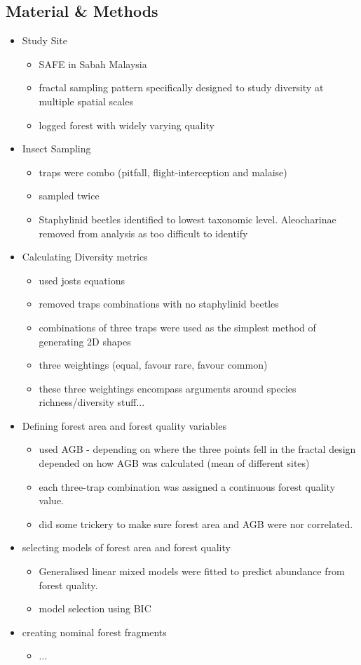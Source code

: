 \subsection*{Material \& Methods}
\begin{itemize}
	\item Study Site
	\begin{itemize}
		\item SAFE in Sabah Malaysia
		\item fractal sampling pattern specifically designed to study diversity at multiple spatial scales
		\item logged forest with widely varying quality
	\end{itemize}
	\item Insect Sampling
	\begin{itemize}
		\item traps were combo (pitfall, flight-interception and malaise)
		\item sampled twice
		\item Staphylinid beetles identified to lowest taxonomic level. Aleocharinae removed from analysis as too difficult to identify
	\end{itemize}
	\item Calculating Diversity metrics
	\begin{itemize}
		\item used josts equations
		\item removed traps combinations with no staphylinid beetles
		\item combinations of three traps were used as the simplest method of generating 2D shapes
		\item three weightings (equal, favour rare, favour common)
		\item these three weightings encompass arguments around species richness/diversity stuff...
	\end{itemize}
	\item Defining forest area and forest quality variables
	\begin{itemize}
		\item used AGB - depending on where the three points fell in the fractal design depended on how AGB was calculated (mean of different sites)
		\item each three-trap combination was assigned a continuous forest quality value.
		\item did some trickery to make sure forest area and AGB were nor correlated.
	\end{itemize}
	\item selecting models of forest area and forest quality
	\begin{itemize}
		\item Generalised linear mixed models were fitted to predict abundance from forest quality.
		\item model selection using BIC
	\end{itemize}
	\item creating nominal forest fragments
	\begin{itemize}
		\item ...
	\end{itemize}
\end{itemize}

